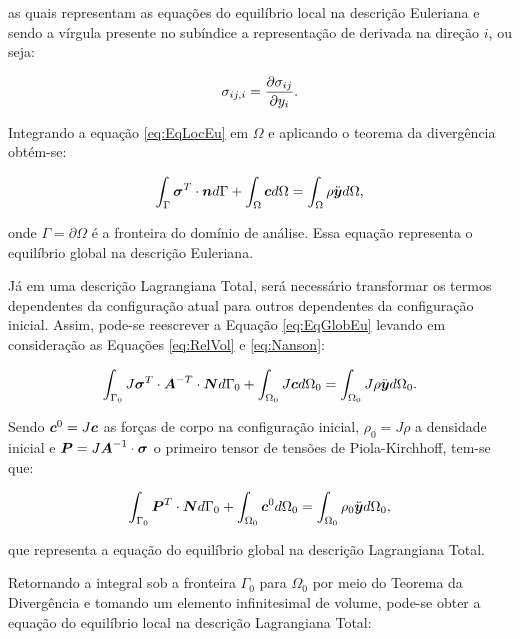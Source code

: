 \noindent as quais representam as equações do equilíbrio local na descrição Euleriana e sendo a vírgula presente no subíndice a representação de derivada na direção $i$, ou seja:

\begin{equation}
    \sigma_{ij,i}=\frac{\partial{\sigma_{ij}}}{\partial{y_i}}\text{.}
\end{equation}

Integrando a equação \ref{eq:EqLocEu} em $\Omega$ e aplicando o teorema da divergência obtém-se:

\begin{equation}
    \int_\Gamma{\boldsymbol{\sigma}^T\cdot\boldsymbol{n}d\Gamma}+\int_\Omega{\boldsymbol{c}d\Omega}=\int_\Omega{\rho\ddot{\boldsymbol{y}}d\Omega}
    \text{,}
    \label{eq:EqGlobEu}
\end{equation}

\noindent onde $\Gamma=\partial\Omega$ é a fronteira do domínio de análise. Essa equação representa o equilíbrio global na descrição Euleriana.

Já em uma descrição Lagrangiana Total, será necessário transformar os termos dependentes da configuração atual para outros dependentes da configuração inicial. Assim, pode-se reescrever a Equação \ref{eq:EqGlobEu} levando em consideração as Equações \ref{eq:RelVol} e \ref{eq:Nanson}:

\begin{equation}
    \int_{\Gamma_0}{J\boldsymbol{\sigma}^T\cdot\boldsymbol{A}^{-T}\cdot\boldsymbol{N}d\Gamma_0}+\int_{\Omega_0}{J\boldsymbol{c}d\Omega_0}=\int_{\Omega_0}{J\rho\ddot{\boldsymbol{y}}d\Omega_0}
    \text{.}
\end{equation}

\noindent Sendo $\boldsymbol{c}^0=J\boldsymbol{c}$ as forças de corpo na configuração inicial, $\rho_0=J\rho$ a densidade inicial e $\boldsymbol{P}=J\boldsymbol{A}^{-1}\cdot\boldsymbol{\sigma}$ o primeiro tensor de tensões de Piola-Kirchhoff, tem-se que:

\begin{equation}
    \int_{\Gamma_0}{\boldsymbol{P}^T\cdot\boldsymbol{N}d\Gamma_0}+\int_{\Omega_0}{\boldsymbol{c}^0d\Omega_0}=\int_{\Omega_0}{\rho_0\ddot{\boldsymbol{y}}d\Omega_0}\text{,}
\end{equation}

\noindent que representa a equação do equilíbrio global na descrição Lagrangiana Total.

Retornando a integral sob a fronteira $\Gamma_0$ para $\Omega_0$ por meio do Teorema da Divergência e tomando um elemento infinitesimal de volume, pode-se obter a equação do equilíbrio local na descrição Lagrangiana Total:

